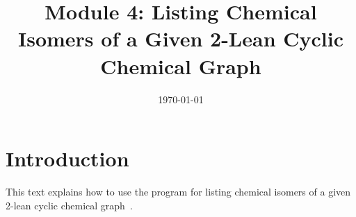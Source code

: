 \documentclass[11pt,titlepage,dvipdfmx,twoside]{article}
\title{\huge{
Module 4:
Listing Chemical Isomers of a Given 2-Lean Cyclic Chemical Graph}}
\author{\project}
\begin{document}

\date{\today}

\maketitle


\thispagestyle{empty}
\tableofcontents
\clearpage



\section{Introduction}
\label{sec:intro}

This text explains how to use the program for listing
chemical isomers of a given 2-lean cyclic chemical graph~\cite{branch}.
\end{document}
